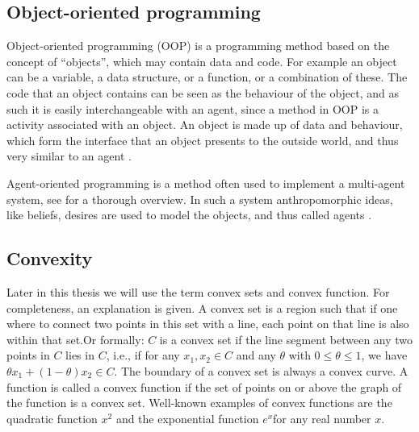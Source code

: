 \subsection{Object-oriented programming}

Object-oriented programming (OOP) is a programming method based on the concept of ``objects'', which may contain data and code. For example an object can be a variable, a data structure, or a function, or a combination of these. The code that an object contains can be seen as the behaviour of the object, and as such it is easily interchangeable with an agent, since a method in OOP is a activity associated with an object. An object is made up of data and behaviour, which form the interface that an object presents to the outside world, and thus very similar to an agent \citep{shoham1993agent}. 

Agent-oriented programming is a method often used to implement a multi-agent system, see \citet{mahar2012agent} for a thorough overview. In such a system anthropomorphic ideas, like beliefs, desires are used to model the objects, and thus called agents \citep{shoham1993agent}.%

% 


\subsection{Convexity}
\label{sec:convex}
Later in this thesis we will use the term convex sets and convex function. For completeness, an explanation is given. A convex set is a region such that if one where to connect two points in this set with a line, each point on that line is also within that set.Or formally: $C$ is a convex set if the line segment between any two points in $C$ lies in $C$, i.e., if for any $x_1, x_2 \in C$ and any $\theta$ with $0 \leq \theta \leq 1$, we have $\theta x_1 + (1 − \theta )x_2 \in C$. %
The boundary of a convex set is always a convex curve. A function is called a convex function if the set of points on or above the graph of the function is a convex set. Well-known examples of convex functions are the quadratic function $x^{2}$ and the exponential function $e^{x} $for any real number $x$.

